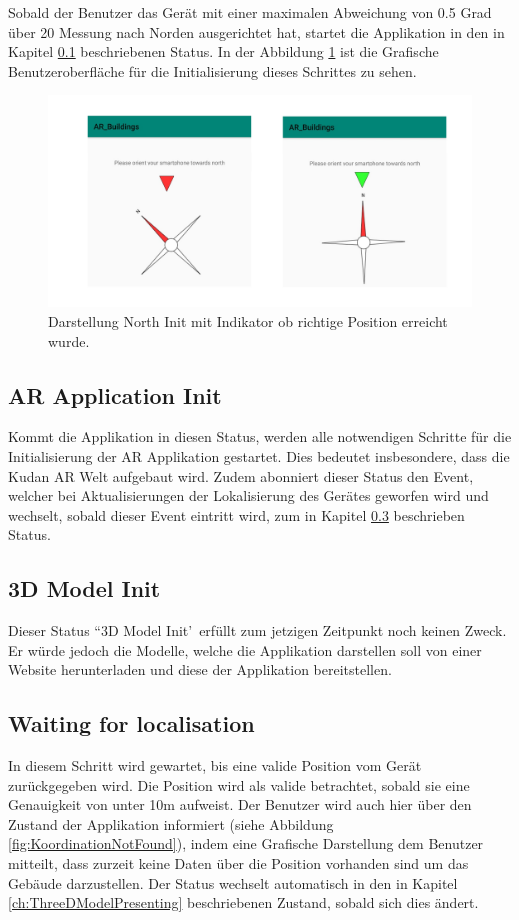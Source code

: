 \documentclass[a4paper]{scrreprt}
\begin{document}
Sobald der Benutzer das Gerät mit einer maximalen Abweichung von 0.5 Grad über 20 Messung nach Norden ausgerichtet hat, startet die Applikation in den in Kapitel \ref{ch:ARApplicationInit} beschriebenen Status. In der Abbildung \ref{fig:NorthInitProcess} ist die Grafische Benutzeroberfläche für die Initialisierung dieses Schrittes zu sehen.
\begin{figure}[h!]
	\includegraphics[keepaspectratio, width=\textwidth]{NorthInitProcess.png}
	\caption{Darstellung North Init mit Indikator ob richtige Position erreicht wurde.}
    \label{fig:NorthInitProcess}
\end{figure}

\subsection{AR Application Init} \label{ch:ARApplicationInit}
Kommt die Applikation in diesen Status, werden alle notwendigen Schritte für die Initialisierung der AR Applikation gestartet. Dies bedeutet insbesondere, dass die Kudan AR Welt aufgebaut wird. Zudem abonniert dieser Status den Event, welcher bei Aktualisierungen der Lokalisierung des Gerätes geworfen wird und wechselt, sobald dieser Event eintritt wird, zum in Kapitel \ref{ch:waitingForLocation} beschrieben Status.

\subsection{3D Model Init}
Dieser Status \textquotedblleft 3D Model Init\textquoteright\ erfüllt zum jetzigen Zeitpunkt noch keinen Zweck. Er würde jedoch die Modelle, welche die Applikation darstellen soll von einer Website herunterladen und diese der Applikation bereitstellen.

\subsection{Waiting for localisation} \label{ch:waitingForLocation}
In diesem Schritt wird gewartet, bis eine valide Position vom Gerät zurückgegeben wird. Die Position wird als valide betrachtet, sobald sie eine Genauigkeit von unter 10m aufweist. Der Benutzer wird auch hier über den Zustand der Applikation informiert (siehe Abbildung \ref{fig:KoordinationNotFound}), indem eine Grafische Darstellung dem Benutzer mitteilt, dass zurzeit keine Daten über die Position vorhanden sind um das Gebäude darzustellen. Der Status wechselt automatisch in den in Kapitel \ref{ch:ThreeDModelPresenting} beschriebenen Zustand, sobald sich dies ändert.
\end{document}

